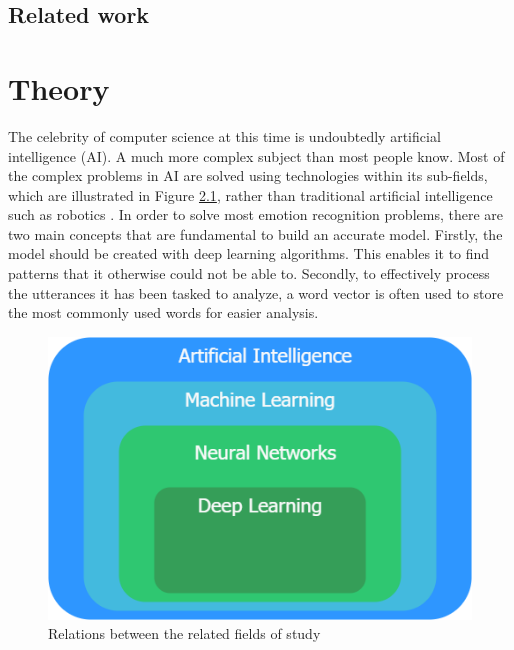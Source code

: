\documentclass[nofilelist]{cslthse-msc}
\begin{document}
\section{Related work}





\chapter{Theory}

The celebrity of computer science at this time is undoubtedly artificial intelligence (AI). A much more complex subject than most people know. Most of the complex problems in AI are solved using technologies within its sub-fields, which are illustrated in Figure \ref{fig:map}, rather than traditional artificial intelligence such as robotics \citep{bajwa_2020}. 
In order to solve most emotion recognition problems, there are two main concepts that are fundamental to build an accurate model. Firstly, the model should be created with deep learning algorithms. This enables it to find patterns that it otherwise could not be able to. Secondly, to effectively process the utterances it has been tasked to analyze, a word vector is often used to store the most commonly used words for easier analysis.


\begin{figure}[h!]
    \centering
    \includegraphics[scale=0.4]{msccls/explanatory_images/map_of_techniques.png}
    \caption{Relations between the related fields of study }
    \label{fig:map}
\end{figure}
\end{document}
